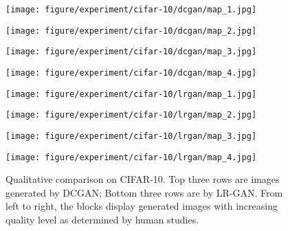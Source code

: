 \documentclass{article} \usepackage{iclr2017_conference,times}
\begin{document}
\begin{figure}[t]
\begin{minipage}{0.245\linewidth}
\center
\texttt{[image: figure/experiment/cifar-10/dcgan/map\_1.jpg]}
\end{minipage}
\begin{minipage}{0.245\linewidth}
\center
\texttt{[image: figure/experiment/cifar-10/dcgan/map\_2.jpg]}
\end{minipage}
\begin{minipage}{0.245\linewidth}
\center
\texttt{[image: figure/experiment/cifar-10/dcgan/map\_3.jpg]}
\end{minipage}
\begin{minipage}{0.245\linewidth}
\center
\texttt{[image: figure/experiment/cifar-10/dcgan/map\_4.jpg]}
\end{minipage}

\begin{minipage}{0.245\linewidth}
\center
\texttt{[image: figure/experiment/cifar-10/lrgan/map\_1.jpg]}
\end{minipage}
\begin{minipage}{0.245\linewidth}
\center
\texttt{[image: figure/experiment/cifar-10/lrgan/map\_2.jpg]}
\end{minipage}
\begin{minipage}{0.245\linewidth}
\center
\texttt{[image: figure/experiment/cifar-10/lrgan/map\_3.jpg]}
\end{minipage}
\begin{minipage}{0.245\linewidth}
\center
\texttt{[image: figure/experiment/cifar-10/lrgan/map\_4.jpg]}
\end{minipage}
\caption{Qualitative comparison on CIFAR-10. Top three rows are images generated by DCGAN; Bottom three rows are by LR-GAN. From left to right, the blocks display generated images with increasing quality level as determined by human studies.}
\label{Fig_CIFARComparison}
\end{figure}
\end{document}
